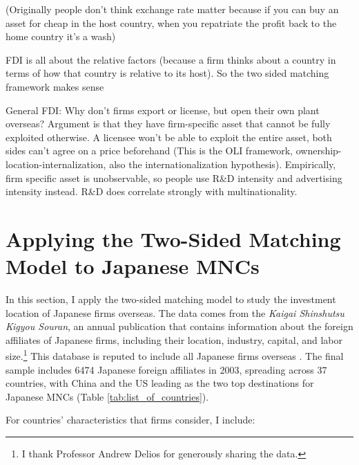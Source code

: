 (Originally people don't think exchange rate matter because if you can buy an
asset for cheap in the host country, when you repatriate the profit back to the
home country it's a wash)

FDI is all about the relative factors (because a firm thinks about a country in
terms of how that country is relative to its host). So the two sided matching
framework makes sense

General FDI: Why don't firms export or license, but open their own plant
overseas? Argument is that they have firm-specific asset that cannot be fully
exploited otherwise. A licensee won't be able to exploit the entire asset, both
sides can't agree on a price beforehand (This is the OLI framework,
ownership-location-internalization, also the internationalization hypothesis). Empirically, firm specific asset is
unobservable, so people use R\&D intensity and advertising intensity instead.
R\&D does correlate strongly with multinationality.


\section{Applying the Two-Sided Matching Model to Japanese MNCs}
\label{sec:application}

In this section, I apply the two-sided matching model to study the investment
location of Japanese firms overseas. The data comes from the \textit{Kaigai
  Shinshutsu Kigyou Souran}, an annual publication that contains information
about the foreign affiliates of Japanese firms, including their location,
industry, capital, and labor size.\footnote{I thank Professor Andrew Delios for
  generously sharing the data.} This database is reputed to include all Japanese
firms overseas \citep{Yamawaki1991}. The final sample includes 6474 Japanese
foreign affiliates in 2003, spreading across 37 countries, with China and the US
leading as the two top destinations for Japanese MNCs (Table \ref{tab:list_of_countries}).

For countries' characteristics that firms consider, I include:

